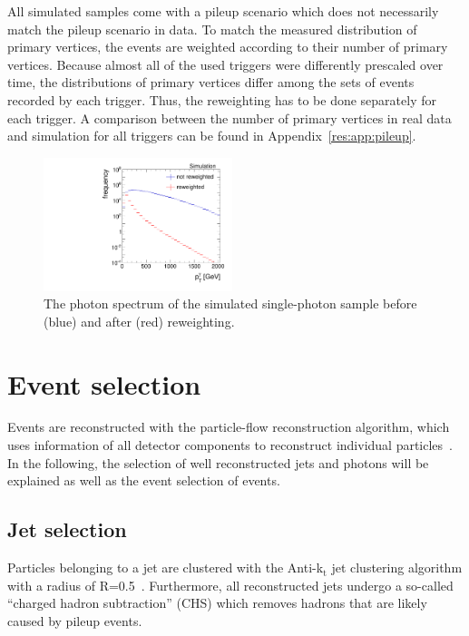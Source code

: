 All simulated samples come with a pileup scenario which does not necessarily match the pileup scenario in data. 
To match the measured distribution of primary vertices, the events are weighted according to their number of primary vertices. 
Because almost all of the used triggers were differently prescaled over time, the distributions of primary vertices differ among the sets of events recorded by each trigger.
Thus, the reweighting has to be done separately for each trigger.
A comparison between the number of primary vertices in real data and simulation for all triggers can be found in Appendix~\ref{res:app:pileup}.
\begin{figure}[ht]
  \centering
      \includegraphics[width=0.49\textwidth]{figures/resolution/eventSelection/PhotonPtComparison_reweighted.pdf} 
  \caption{The photon \pt spectrum of the \pythiaSix simulated single-photon sample before (blue) and after (red) reweighting.}  
  \label{res:fig:PhotonPtSpectrum}
\end{figure}


\section{Event selection}
\label{res:sec:EventSelection}
Events are reconstructed with the particle-flow reconstruction algorithm, which uses information of all detector components to reconstruct individual particles~\cite{CMS-PAS-PFT-09-001}.
In the following, the selection of well reconstructed jets and photons will be explained as well as the event selection of \GAMJET events.

\subsection{Jet selection}
Particles belonging to a jet are clustered with the Anti-k$_{\text{t}}$ jet clustering algorithm with a radius of R=0.5~\cite{Cacciari:2008gp}.
Furthermore, all reconstructed jets undergo a so-called ``charged hadron subtraction'' (CHS) which removes hadrons that are likely caused by pileup events.

